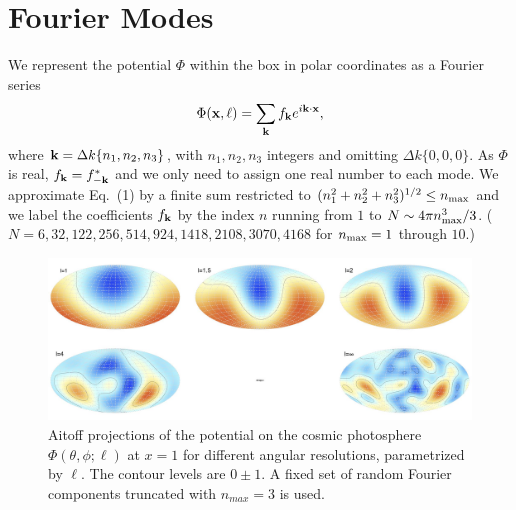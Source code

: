 \documentclass[12pt]{article}
\begin{document}
\section{Fourier Modes}
We represent the potential $\Phi$ within the box in polar coordinates as a Fourier series
\begin{equation}
\Phi({\bf x,\ell})=\sum_{\bf k}f_{\bf k}e^{i{\bf k}\cdot{\bf x}},
\end{equation}
where ${\bf k}=\Delta k\{n_1,n_2,n_3\}$, with $n_1,n_2,n_3$ integers and omitting $\Delta k\{0,0,0\}$. As $\Phi$ is real, $f_{{\bf k}}=f_{-{\bf k}}^\ast$ and we only need to assign one real number to each mode. We approximate Eq.~(1) by a finite sum restricted to $(n_1^2+n_2^2+n_3^2)^{1/2}\le n_{\rm max}$ and we label the coefficients $f_{\bf k}$ by the index $n$ running from $1$ to $N\sim4\pi n_{\rm max}^3/3$. ($N=6,32,122, 256,514,924,1418,2108,3070,4168$ for $n_{\rm max}=1$ through $10$.)
\begin{figure}[h!]
\centering
\includegraphics[width=6in]{fig1.jpg} 
\caption{Aitoff projections of the potential on the cosmic photosphere $\Phi(\theta,\phi;\ell)$ at $x=1$ for different angular resolutions, parametrized by $\ell$. The contour levels are $0\pm1$. A fixed set of random Fourier components truncated with $n_{max}=3$ is used.}
\end{figure}
\end{document}
